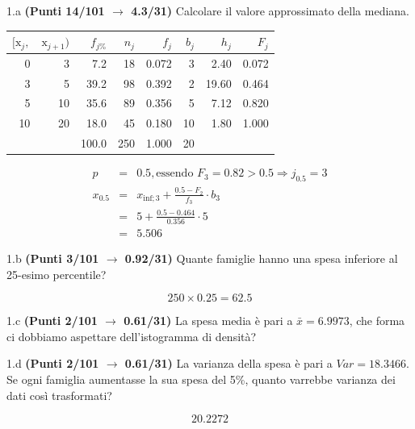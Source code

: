 \documentclass[
  11pt,
]{book}
\theoremstyle{mytheoremstyle}
\theoremstyle{mydefstyle}
\newenvironment{sol}
  {
  \begin{tcolorbox}[enhanced,breakable,arc=0.1mm,boxrule=1pt,colback=white,colframe=iblue,
  title=\bf \fontfamily{lmss}\selectfont \hspace{.5 cm} Soluzione,drop fuzzy shadow]

}{
\end{tcolorbox}
  }
\begin{document}
1.a \textbf{(Punti 14/101 \(\rightarrow\) 4.3/31)} Calcolare il valore approssimato della mediana.

\begin{sol}

\begin{table}[H]
\centering
\begin{tabular}{rrrrrrrr}
\toprule
$[\text{x}_j,$ & $\text{x}_{j+1})$ & $f_{j\%}$ & $n_j$ & $f_j$ & $b_j$ & $h_j$ & $F_j$\\
\midrule
0 & 3 & 7.2 & 18 & 0.072 & 3 & 2.40 & 0.072\\
3 & 5 & 39.2 & 98 & 0.392 & 2 & 19.60 & 0.464\\
5 & 10 & 35.6 & 89 & 0.356 & 5 & 7.12 & 0.820\\
10 & 20 & 18.0 & 45 & 0.180 & 10 & 1.80 & 1.000\\
 &  & 100.0 & 250 & 1.000 & 20 &  & \\
\bottomrule
\end{tabular}
\end{table}

\begin{eqnarray*}
  p &=&  0.5 , \text{essendo }F_{ 3 }= 0.82  > 0.5  \Rightarrow j_{ 0.5 }= 3 \\
  x_{ 0.5 } &=& x_{\text{inf}; 3 } + \frac{ { 0.5 } - F_{ 2 }} {f_{ 3 }} \cdot b_{ 3 } \\
            &=&  5  + \frac {{ 0.5 } -  0.464 } { 0.356 } \cdot  5  \\
            &=&  5.506 
\end{eqnarray*}

\end{sol}

1.b \textbf{(Punti 3/101 \(\rightarrow\) 0.92/31)} Quante famiglie hanno una spesa inferiore al 25-esimo percentile?

\begin{sol}
\[
250\times 0.25=62.5
\]

\end{sol}

1.c \textbf{(Punti 2/101 \(\rightarrow\) 0.61/31)} La spesa media è pari a \(\bar x=6.9973\), che forma ci dobbiamo aspettare dell'istogramma di densità?

1.d \textbf{(Punti 2/101 \(\rightarrow\) 0.61/31)} La varianza della spesa è pari a \(Var=18.3466\).
Se ogni famiglia aumentasse la sua spesa del 5\%, quanto varrebbe varianza dei dati così trasformati?

\begin{sol}
\[20.2272\]

\end{sol}
\end{document}
